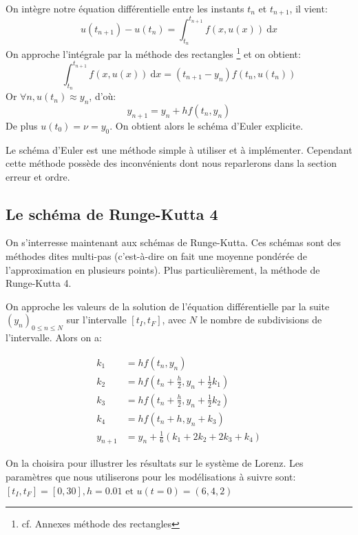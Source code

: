 \documentclass{article}
\newcommand{\cad}{c'est-\`a-dire }
\newtheorem[M , nocut]{prop}{Proposition}[section]
\newtheorem[M , nocut]{definition}{Définition}
\newtheorem[M , nocut]{lemme}{Lemme}
\newtheorem[L , nocut]{thm}{Théoreme}
\newtheorem[M , nocut]{cor}{Corollaire}
\begin{document}
\begin{example}
    On intègre notre équation différentielle entre les instants $t_{n}$ et $t_{n+1}$, il vient:
    \[
      u(t_{n+1}) - u(t_n) = \int_{t_n}^{t_{n+1}} f(x,u(x))\ \mathrm{d}x
    \]
    On approche l'intégrale par la méthode des rectangles \footnote{cf. Annexes méthode des rectangles} et on obtient:
    \[
        \int_{t_n}^{t_{n+1}} f(x,u(x))\ \mathrm{d}x = (t_{n+1}-y_n)f(t_n,u(t_n))
    \]Or $\forall n , u(t_n) \approx y_n $, d'où:
    \[
        y_{n+1} = y_n + h f(t_n,y_n)
    \]De plus $u(t_0) = \nu = y_0$. On obtient alors le schéma d'Euler explicite.
\end{example}
Le schéma d'Euler est une méthode simple à utiliser et à implémenter. Cependant cette méthode possède des inconvénients dont nous reparlerons dans la section erreur et ordre. 

\subsection*{Le schéma de Runge-Kutta 4}

On s'interresse maintenant aux schémas de Runge-Kutta. Ces schémas sont des méthodes dites multi-pas (\cad on fait une moyenne pondérée de l'approximation en plusieurs points). Plus particulièrement, la méthode de Runge-Kutta 4.
\begin{definition}
    On approche les valeurs de la solution de l'équation différentielle par la suite $(y_n)_{0\le n \le N}$ sur l'intervalle $[t_I,t_F]$, avec $N$ le nombre de subdivisions de l'intervalle. Alors on a: 

    \begin{align*}
    k_1 &= h f(t_n, y_n) \\
    k_2 &= h f\left(t_n + \frac{h}{2}, y_n + \frac{1}{2}k_1\right) \\
    k_3 &= h f\left(t_n + \frac{h}{2}, y_n + \frac{1}{2}k_2\right) \\
    k_4 &= h f(t_n + h, y_n + k_3)\\
    y_{n+1} &= y_n + \frac{1}{6}(k_1 + 2k_2 + 2k_3 + k_4) 
    \end{align*}
\end{definition}
On la choisira pour illustrer les résultats sur le système de Lorenz. Les paramètres que nous utiliserons pour les modélisations à suivre sont: $[t_I,t_F] = [0,30], h = 0.01 \text{ et }u(t=0)= (6,4,2)$
\end{document}
